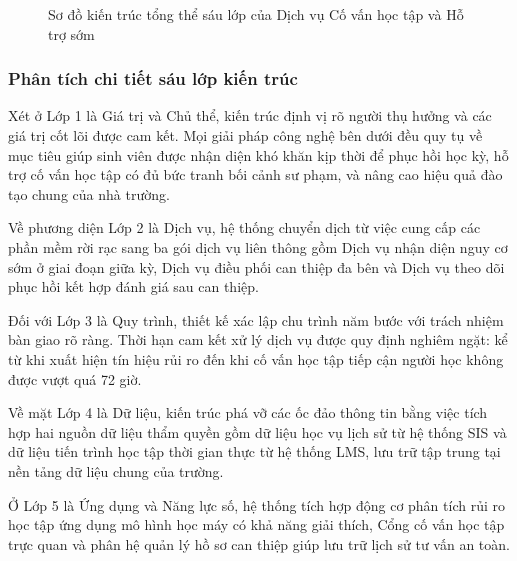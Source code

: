 \begin{figure}[htbp]
\caption{Sơ đồ kiến trúc tổng thể sáu lớp của Dịch vụ Cố vấn học tập và Hỗ trợ sớm}
\label{fig:six_layers}
\end{figure}

\subsubsection{Phân tích chi tiết sáu lớp kiến trúc}
Xét ở Lớp 1 là Giá trị và Chủ thể, kiến trúc định vị rõ người thụ hưởng và các giá trị cốt lõi được cam kết. Mọi giải pháp công nghệ bên dưới đều quy tụ về mục tiêu giúp sinh viên được nhận diện khó khăn kịp thời để phục hồi học kỳ, hỗ trợ cố vấn học tập có đủ bức tranh bối cảnh sư phạm, và nâng cao hiệu quả đào tạo chung của nhà trường.

Về phương diện Lớp 2 là Dịch vụ, hệ thống chuyển dịch từ việc cung cấp các phần mềm rời rạc sang ba gói dịch vụ liên thông gồm Dịch vụ nhận diện nguy cơ sớm ở giai đoạn giữa kỳ, Dịch vụ điều phối can thiệp đa bên và Dịch vụ theo dõi phục hồi kết hợp đánh giá sau can thiệp.

Đối với Lớp 3 là Quy trình, thiết kế xác lập chu trình năm bước với trách nhiệm bàn giao rõ ràng. Thời hạn cam kết xử lý dịch vụ được quy định nghiêm ngặt: kể từ khi xuất hiện tín hiệu rủi ro đến khi cố vấn học tập tiếp cận người học không được vượt quá 72 giờ.

Về mặt Lớp 4 là Dữ liệu, kiến trúc phá vỡ các ốc đảo thông tin bằng việc tích hợp hai nguồn dữ liệu thẩm quyền gồm dữ liệu học vụ lịch sử từ hệ thống SIS và dữ liệu tiến trình học tập thời gian thực từ hệ thống LMS, lưu trữ tập trung tại nền tảng dữ liệu chung của trường.

Ở Lớp 5 là Ứng dụng và Năng lực số, hệ thống tích hợp động cơ phân tích rủi ro học tập ứng dụng mô hình học máy có khả năng giải thích, Cổng cố vấn học tập trực quan và phân hệ quản lý hồ sơ can thiệp giúp lưu trữ lịch sử tư vấn an toàn.

